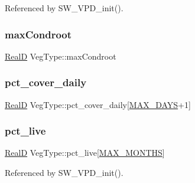 Referenced by S\+W\+\_\+\+V\+P\+D\+\_\+init().

\mbox{\label{struct_veg_type_ad52fa22fc31200ff6ccf429746e947ad}} 
\subsubsection{\texorpdfstring{max\+Condroot}{maxCondroot}}
{\footnotesize\ttfamily \hyperlink{generic_8h_af1c105fd5732f70b91ddaeda0cc340e3}{RealD} Veg\+Type\+::max\+Condroot}

\mbox{\label{struct_veg_type_a4e83736604de06c0958fa88a76221062}} 
\subsubsection{\texorpdfstring{pct\+\_\+cover\+\_\+daily}{pct\_cover\_daily}}
{\footnotesize\ttfamily \hyperlink{generic_8h_af1c105fd5732f70b91ddaeda0cc340e3}{RealD} Veg\+Type\+::pct\+\_\+cover\+\_\+daily\mbox{[}\hyperlink{_times_8h_a01f08d46080872b9f4284873b7f9dee4}{M\+A\+X\+\_\+\+D\+A\+YS}+1\mbox{]}}

\mbox{\label{struct_veg_type_a9a61329df61a5decb05e795460f079dd}} 
\subsubsection{\texorpdfstring{pct\+\_\+live}{pct\_live}}
{\footnotesize\ttfamily \hyperlink{generic_8h_af1c105fd5732f70b91ddaeda0cc340e3}{RealD} Veg\+Type\+::pct\+\_\+live\mbox{[}\hyperlink{_times_8h_a9c97e6841188b672e984a4eba7479277}{M\+A\+X\+\_\+\+M\+O\+N\+T\+HS}\mbox{]}}



Referenced by S\+W\+\_\+\+V\+P\+D\+\_\+init().

\mbox{\label{struct_veg_type_ab621b22f5c59574f62956abe8e96efaa}} 
